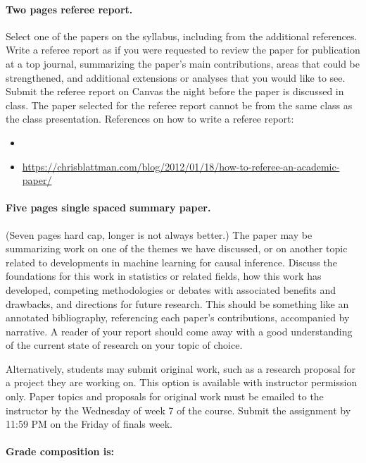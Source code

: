 \documentclass[letterpaper, 12pt, parskip=full,DIV=10]{scrartcl}
\begin{document}
\paragraph{Two pages referee report.}
Select one of the papers on the syllabus, including from the additional references. Write a referee report as if you were requested to review the paper for publication at a top journal, summarizing the paper's main contributions, areas that could be strengthened, and additional extensions or analyses that you would like to see. Submit the referee report on Canvas the night before the paper is discussed in class. The paper selected for the referee report cannot be from the same class as the class presentation. 
References on how to write a referee report:
\begin{itemize}
\item {}
 \item \url{https://chrisblattman.com/blog/2012/01/18/how-to-referee-an-academic-paper/}
 \end{itemize}

\paragraph{Five pages single spaced summary paper.} (Seven pages hard cap, longer is not always better.)
The paper may be summarizing work on one of the themes we have discussed, or on another topic related to developments in machine learning for causal inference. Discuss the foundations for this work in statistics or related fields, how this work has developed, competing methodologies or debates with associated benefits and drawbacks, and directions for future research. This should be something like an annotated bibliography, referencing each paper's contributions, accompanied by narrative. A reader of your report should come away with a good understanding of the current state of research on your topic of choice. 

Alternatively, students may submit original work, such as a research proposal for a project they are working on. 
This option is available with instructor permission only. Paper topics and proposals for original work must be emailed to the instructor by the Wednesday of week 7 of the course. 
Submit the assignment by 11:59 PM on the Friday of finals week. 


\paragraph{Grade composition is:}
\end{document}
